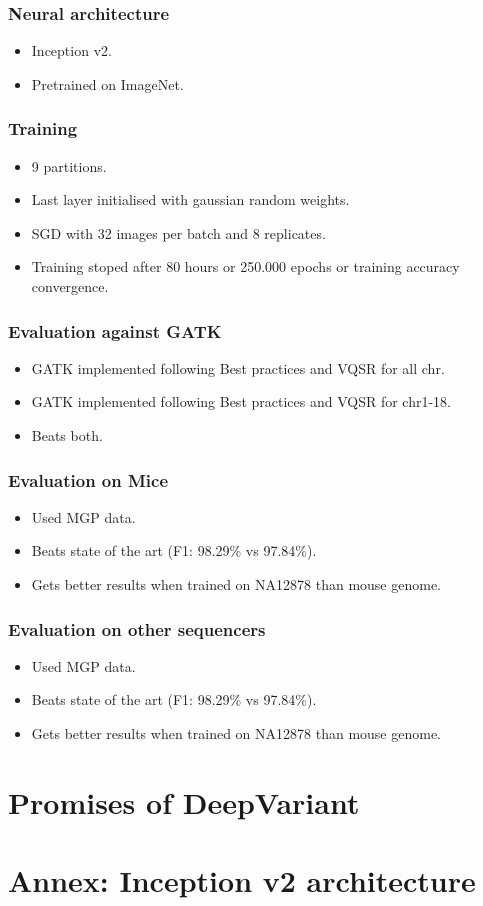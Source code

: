 \documentclass{beamer}
\begin{document}
\begin{frame}
    \frametitle{Neural architecture}

    \begin{itemize}
        \item Inception v2.
        \item Pretrained on ImageNet.
    \end{itemize}
\end{frame}

\begin{frame}
    \frametitle{Training}

    \begin{itemize}
        \item 9 partitions.
        \item Last layer initialised with gaussian random weights.
        \item SGD with 32 images per batch and 8 replicates.
        \item Training stoped after 80 hours or 250.000 epochs or training accuracy convergence.
    \end{itemize}
\end{frame}

\begin{frame}
    \frametitle{Evaluation against GATK}

    \begin{itemize}
        \item GATK implemented following Best practices and VQSR for all chr.
        \item GATK implemented following Best practices and VQSR for chr1-18.
        \item Beats both.
    \end{itemize}
\end{frame}

\begin{frame}
    \frametitle{Evaluation on Mice}

    \begin{itemize}
        \item Used MGP data.
        \item Beats state of the art (F1: 98.29\% vs 97.84\%).
        \item Gets better results when trained on NA12878 than mouse genome.
    \end{itemize}
\end{frame}

\begin{frame}
    \frametitle{Evaluation on other sequencers}

    \begin{itemize}
        \item Used MGP data.
        \item Beats state of the art (F1: 98.29\% vs 97.84\%).
        \item Gets better results when trained on NA12878 than mouse genome.
    \end{itemize}
\end{frame}

\section{Promises of DeepVariant}

\section{Annex: Inception v2 architecture}
\end{document}

